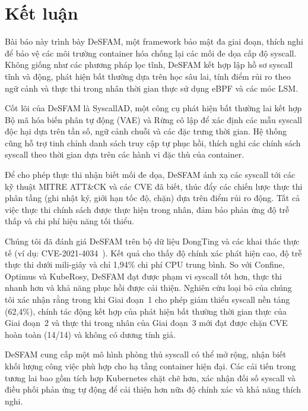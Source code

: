 \section{Kết luận}
\label{sec:conclusion}

Bài báo này trình bày DeSFAM, một framework bảo mật đa giai đoạn, thích nghi để bảo vệ các môi trường container hóa chống lại các mối đe dọa cấp độ syscall. Không giống như các phương pháp lọc tĩnh, DeSFAM kết hợp lập hồ sơ syscall tĩnh và động, phát hiện bất thường dựa trên học sâu lai, tính điểm rủi ro theo ngữ cảnh và thực thi trong nhân thời gian thực sử dụng eBPF và các móc LSM.

Cốt lõi của DeSFAM là SyscallAD, một công cụ phát hiện bất thường lai kết hợp Bộ mã hóa biến phân tự động (VAE) và Rừng cô lập để xác định các mẫu syscall độc hại dựa trên tần số, ngữ cảnh chuỗi và các đặc trưng thời gian. Hệ thống cũng hỗ trợ tinh chỉnh danh sách truy cập tự phục hồi, thích nghi các chính sách syscall theo thời gian dựa trên các hành vi đặc thù của container.

Để cho phép thực thi nhận biết mối đe dọa, DeSFAM ánh xạ các syscall tới các kỹ thuật MITRE ATT\&CK và các CVE đã biết, thúc đẩy các chiến lược thực thi phân tầng (ghi nhật ký, giới hạn tốc độ, chặn) dựa trên điểm rủi ro động. Tất cả việc thực thi chính sách được thực hiện trong nhân, đảm bảo phản ứng độ trễ thấp và chi phí hiệu năng tối thiểu.

Chúng tôi đã đánh giá DeSFAM trên bộ dữ liệu DongTing và các khai thác thực tế (ví dụ: CVE-2021-4034~\cite{cve_2021_4034}). Kết quả cho thấy độ chính xác phát hiện cao, độ trễ thực thi dưới mili-giây và chỉ 1,94\% chi phí CPU trung bình. So với Confine, Optimus và KubeRosy, DeSFAM đạt được phạm vi syscall tốt hơn, thực thi nhanh hơn và khả năng phục hồi được cải thiện. Nghiên cứu loại bỏ của chúng tôi xác nhận rằng trong khi Giai đoạn~1 cho phép giảm thiểu syscall nền tảng (62,4\%), chính tác động kết hợp của phát hiện bất thường thời gian thực của Giai đoạn~2 và thực thi trong nhân của Giai đoạn~3 mới đạt được chặn CVE hoàn toàn (14/14) và không có dương tính giả.

DeSFAM cung cấp một mô hình phòng thủ syscall có thể mở rộng, nhận biết khối lượng công việc phù hợp cho hạ tầng container hiện đại. Các cải tiến trong tương lai bao gồm tích hợp Kubernetes chặt chẽ hơn, xác nhận đối số syscall và điều phối phản ứng tự động để cải thiện hơn nữa độ chính xác và khả năng thích nghi.
